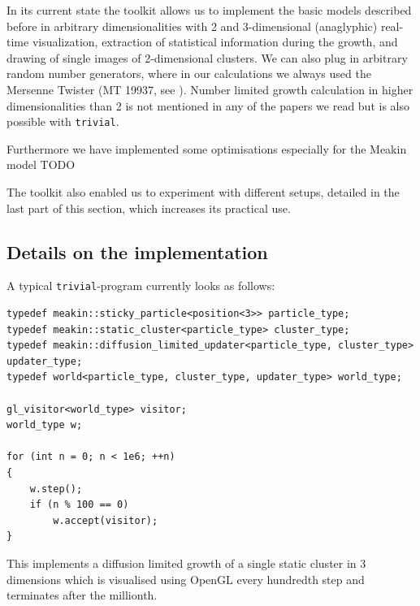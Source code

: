 \documentclass[twocolumn,10pt]{scrartcl}
\begin{document}
        In its current state the toolkit allows us to implement the basic models described before in arbitrary
        dimensionalities with 2 and 3-dimensional (anaglyphic) real-time visualization, extraction of statistical
        information during the growth, and drawing of single images of 2-dimensional clusters. We can also plug in
        arbitrary random number generators, where in our calculations we always used the Mersenne Twister (MT 19937, see
        \cite{src-matsumoto}).  Number limited growth calculation in higher dimensionalities than 2 is not mentioned in
        any of the papers we read but is also possible with \lstinline'trivial'.

        Furthermore we have implemented some optimisations especially for the Meakin model
        TODO
        
        The toolkit also enabled us to experiment with different setups, detailed in the last part of this section,
        which increases its practical use.


        \subsection{Details on the implementation}
            A typical \lstinline'trivial'-program currently looks as follows:
            \begin{lstlisting}
typedef meakin::sticky_particle<position<3>> particle_type;
typedef meakin::static_cluster<particle_type> cluster_type;
typedef meakin::diffusion_limited_updater<particle_type, cluster_type> updater_type;
typedef world<particle_type, cluster_type, updater_type> world_type;

gl_visitor<world_type> visitor;
world_type w;

for (int n = 0; n < 1e6; ++n)
{
    w.step();
    if (n % 100 == 0)
        w.accept(visitor);
}
            \end{lstlisting}
            This implements a diffusion limited growth of a single static cluster in 3 dimensions which is visualised
            using OpenGL every hundredth step and terminates after the millionth.
\end{document}
